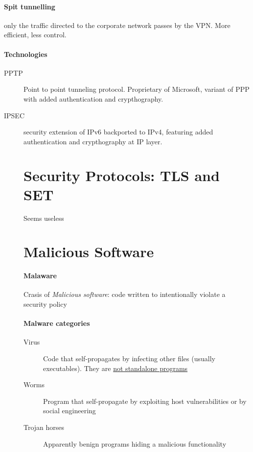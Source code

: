 \documentclass{article}
\begin{document}
\paragraph{Spit tunnelling} only the traffic directed to the corporate network passes by the VPN. More efficient, less control.
\paragraph{Technologies}
\begin{description}
\item[PPTP] Point to point tunneling protocol. Proprietary of Microsoft, variant of PPP with added authentication and crypthography.
\item[IPSEC] security extension of IPv6 backported to IPv4, featuring added authentication and crypthography at IP layer.
\section{Security Protocols: TLS and SET}
Seems useless %
\section{Malicious Software}
\paragraph{Malaware} Crasis of \textit{Malicious software}: code written to intentionally violate a security policy
\paragraph{Malware categories}
\begin{description}
\item[Virus] Code that self-propagates by infecting other files (usually executables). They are \underline{not standalone programs}
\item[Worms] Program that self-propagate by exploiting host vulnerabilities or by social engineering
\item[Trojan horses] Apparently benign programs hiding a malicious functionality
\end{description}

\end{description}
\end{document}
